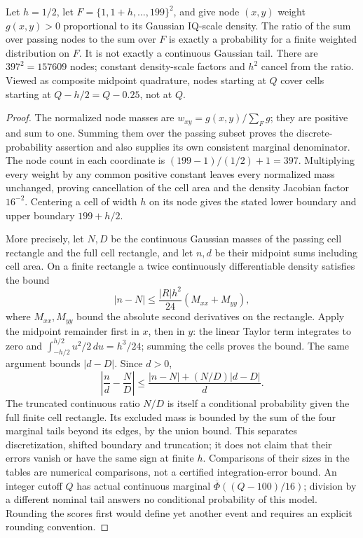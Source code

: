\begin{proposition}
\label{tw:grid}
Let \(h=1/2\), let \(F=\{1,1+h,\ldots,199\}^2\), and give node
\((x,y)\) weight \(g(x,y)>0\) proportional to its Gaussian IQ-scale
density. The ratio of the sum over passing nodes to the sum over \(F\)
is exactly a probability for a finite weighted distribution on \(F\).
It is not exactly a continuous Gaussian tail. There are \(397^2=157609\)
nodes; constant density-scale factors and \(h^2\) cancel from the ratio.
Viewed as composite midpoint quadrature, nodes starting at \(Q\) cover
cells starting at \(Q-h/2=Q-0.25\), not at \(Q\).
\end{proposition}
\begin{proof}
The normalized node masses are
\(w_{xy}=g(x,y)/\sum_Fg\); they are positive and sum to one. Summing
them over the passing subset proves the discrete-probability assertion and
also supplies its own consistent marginal denominator. The node count in
each coordinate is \((199-1)/(1/2)+1=397\). Multiplying every weight by
any common positive constant leaves every normalized mass unchanged,
proving cancellation of the cell area and the density Jacobian factor
\(16^{-2}\). Centering a cell of width \(h\) on its node gives the
stated lower boundary and upper boundary \(199+h/2\).

More precisely, let \(N,D\) be the continuous Gaussian masses of the
passing cell rectangle and the full cell rectangle, and let \(n,d\) be
their midpoint sums including cell area. On a finite rectangle a twice
continuously differentiable density satisfies the bound
\[
 |n-N|\leq\frac{|R|h^2}{24}(M_{xx}+M_{yy}),
\]
where \(M_{xx},M_{yy}\) bound the absolute second derivatives on the
rectangle. Apply the midpoint remainder first in \(x\), then in \(y\):
the linear Taylor term integrates to zero and
\(\int_{-h/2}^{h/2}u^2/2\,du=h^3/24\); summing the cells proves the
bound. The same argument bounds \(|d-D|\). Since \(d>0\),
\[
 \left|\frac nd-\frac ND\right|
 \leq\frac{|n-N|+(N/D)|d-D|}{d}.
\]
The truncated continuous ratio \(N/D\) is itself a conditional probability
given the full finite cell rectangle. Its excluded mass is bounded by the
sum of the four marginal tails beyond its edges, by the union bound.
This separates discretization, shifted boundary and truncation; it does
not claim that their errors vanish or have the same sign at finite \(h\).
Comparisons of their sizes in the tables are numerical comparisons, not a
certified integration-error bound. An integer cutoff \(Q\) has actual
continuous marginal \(\overline\Phi((Q-100)/16)\); division by a
different nominal tail answers no conditional probability of this model.
Rounding the scores first would define yet another event and requires an
explicit rounding convention.
\end{proof}

